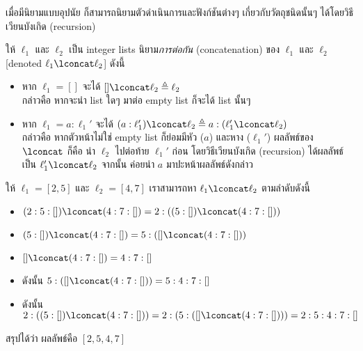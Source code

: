 เมื่อมีนิยามแบบอุปนัย ก็สามารถนิยามตัวดำเนินการและฟังก์ชันต่างๆ เกี่ยวกับวัตถุชนิดนั้นๆ ได้โดยวิธีเวียนบังเกิด (recursion)
\begin{definition}
ให้ $\ell_1$ และ $\ell_2$ เป็น integer lists \enskip นิยาม\emph{การต่อกัน} (concatenation) ของ $\ell_1$ และ $\ell_2$ [denoted $\ell_1\lconcat\ell_2$] ดังนี้
\begin{itemize}
\item หาก $\ell_1=[]$ จะได้ $[]\lconcat\ell_2\triangleq\ell_2$ \\
กล่าวคือ หากจะนำ list ใดๆ มาต่อ empty list ก็จะได้ list นั้นๆ

\item หาก $\ell_1=a:\ell_1'$ จะได้ $(a:\ell_1')\lconcat\ell_2\triangleq a:(\ell_1'\lconcat\ell_2)$ \\
กล่าวคือ หากตัวหน้าไม่ใช่ empty list ก็ย่อมมีหัว ($a$) และหาง ($\ell_1'$) \enskip ผลลัพธ์ของ $\lconcat$ ก็คือ นำ $\ell_2$ ไปต่อท้าย $\ell_1'$ ก่อน โดยวิธีเวียนบังเกิด (recursion) ได้ผลลัพธ์เป็น $\ell_1'\lconcat\ell_2$ \enskip จากนั้น ค่อยนำ $a$ มาปะหน้าผลลัพธ์ดังกล่าว
\end{itemize}
\end{definition}
%
\begin{example}
ให้ $\ell_1=[2,5]$ และ $\ell_2=[4,7]$ เราสามารถหา $\ell_1\lconcat\ell_2$ ตามลำดับดังนี้
\begin{itemize}
\item $(2:5:[])\lconcat(4:7:[])=2:((5:[])\lconcat(4:7:[]))$
\item $(5:[])\lconcat(4:7:[])=5:([]\lconcat(4:7:[]))$
\item $[]\lconcat(4:7:[])=4:7:[]$
\item ดังนั้น $5:([]\lconcat(4:7:[]))=5:4:7:[]$
\item ดังนั้น $2:((5:[])\lconcat(4:7:[]))=2:(5:([]\lconcat(4:7:[])))=2:5:4:7:[]$
\end{itemize}
สรุปได้ว่า ผลลัพธ์คือ $[2,5,4,7]$
\end{example}

